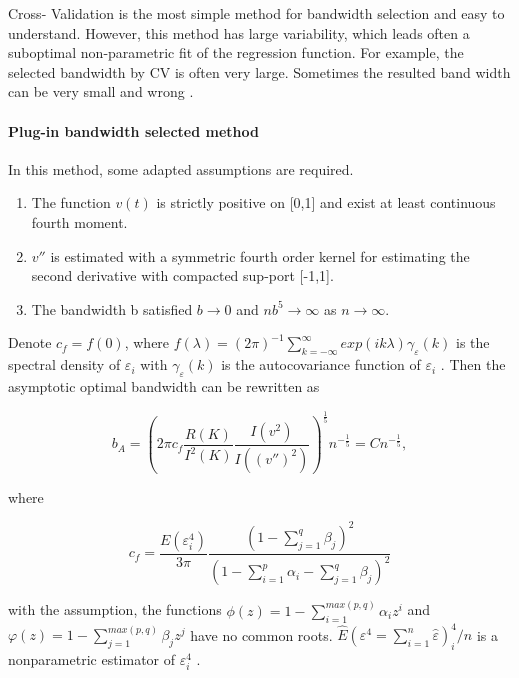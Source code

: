 Cross- Validation is the most simple method for bandwidth selection and easy to understand. However, this method has large variability, which leads often a suboptimal non-parametric fit of the regression function. For example, the selected bandwidth by CV is often very large. Sometimes the resulted band width can be very small and wrong \cite{Altman1995}. 

\paragraph{Plug-in bandwidth selected method}

In this method, some adapted assumptions are required.


\begin{enumerate}
    \item The function $v(t)$ is strictly positive on [0,1] and exist at least continuous fourth moment.    
    \item $v''$ is estimated with a symmetric fourth order kernel for estimating the second derivative with compacted sup-port [-1,1].
    \item The bandwidth b satisfied $b \rightarrow 0$  and $nb^{5} \rightarrow \infty $  as $n \rightarrow \infty$.
\end{enumerate}

Denote $c_{f}=f(0)$, where $f(\lambda)=(2\pi)^{-1}\sum_{k=-\infty}^{\infty}exp(ik\lambda)\gamma_{\varepsilon}(k)$ is the spectral density of $\varepsilon_{i}$  with $\gamma_{\varepsilon}(k)$ is the autocovariance function of $\varepsilon_{i}$ . Then the asymptotic optimal bandwidth can be rewritten as 

\begin{equation}
b_{A} =(2\pi c_{f} \frac{R(K)}{I^{2}(K)}\frac{I(v^{2})}{I((v'')^2)})^{\frac{1}{5}}n^{-\frac{1}{5}} = Cn^{-\frac{1}{5}},
\end{equation}

where

\begin{equation}
c_{f}=\frac{E(\varepsilon_{i}^{4})}{3\pi}\frac{(1-\sum_{j=1}^{q}\beta_{j})^{2}}{(1-\sum_{i=1}^{p}\alpha_{i}-\sum_{j=1}^{q}\beta_{j})^{2}}
\end{equation}
 
with the assumption, the functions $\phi(z)=1-\sum_{i=1}^{max(p,q)}\alpha_{i}z^{i}$ and $\varphi(z)=1-\sum_{j=1}^{max(p,q)}\beta_{j}z^{j}$ have no common roots. $\hat{E}(\varepsilon^{4}=\sum_{i=1}^{n}\hat{\varepsilon})_{i}^{4}/n$ is a nonparametric estimator of $\varepsilon_{i}^{4}$ \cite{Feng2004}.

